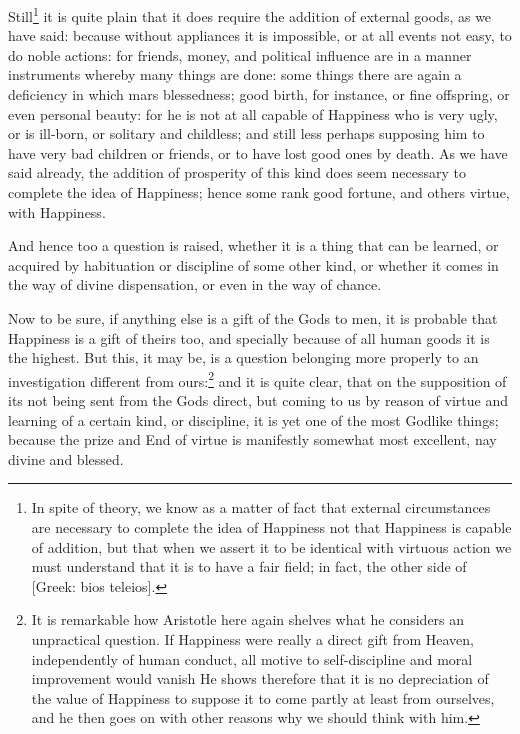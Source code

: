 Still\footnote{In spite of theory, we know as a matter of fact that external circumstances are
necessary to complete the idea of Happiness not that Happiness is capable of
addition, but that when we assert it to be identical with virtuous action we
must understand that it is to have a fair field; in fact, the other side of
[Greek: bios teleios].}
it is quite plain that it does require the addition of external goods, as we
have said: because without appliances it is impossible, or at all events not
easy, to do noble actions: for friends, money, and political influence are in a
manner instruments whereby many things are done: some things there are again a
deficiency in which mars blessedness; good birth, for instance, or fine
offspring, or even personal beauty: for he is not at all capable of Happiness
who is very ugly, or is ill-born, or solitary and childless; and still less
perhaps supposing him to have very bad children or friends, or to have lost
good ones by death. As we have said already, the addition of prosperity of this
kind does seem necessary to complete the idea of Happiness; hence some rank
good fortune, and others virtue, with Happiness.


And hence too a question is raised, whether it is a thing that can be learned,
or acquired by habituation or discipline of some other kind, or whether it
comes in the way of divine dispensation, or even in the way of chance.

Now to be sure, if anything else is a gift of the Gods to men, it is probable
that Happiness is a gift of theirs too, and specially because of all human
goods it is the highest. But this, it may be, is a question belonging more
properly to an investigation different from ours:\footnote{It is remarkable how Aristotle here again shelves what he considers an
unpractical question. If Happiness were really a direct gift from Heaven,
independently of human conduct, all motive to self-discipline and moral
improvement would vanish He shows therefore that it is no depreciation of the
value of Happiness to suppose it to come partly at least from ourselves, and he
then goes on with other reasons why we should think with him.}
and it is quite clear, that on the supposition of its not being sent from the
Gods direct, but coming to us by reason of virtue and learning of a certain
kind, or discipline, it is yet one of the most Godlike things; because the
prize and End of virtue is manifestly somewhat most excellent, nay divine and
blessed.

